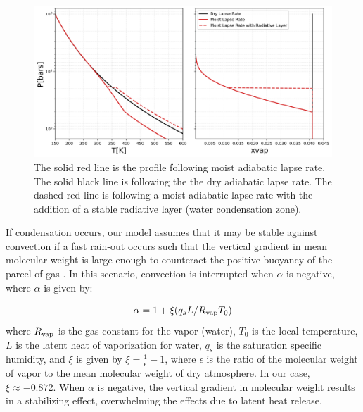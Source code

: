 \documentclass[11pt]{ucscthesisbs}
\begin{document}
\begin{figure}[ht!]
 \centerline{
  \includegraphics[width=6.5in]{figures/comparison_dry_vs_moist_lapse_rates.png}
 }
\caption[A Standard Interior Structure Model]
{The solid red line is the profile following moist adiabatic lapse rate. The solid black line is following the the dry adiabatic lapse rate. The dashed red line is following a moist adiabatic lapse rate with the addition of a stable radiative layer (water condensation zone).} 
\label{fig:comparison_adiabatic_profiles}
\end{figure}


If condensation occurs, our model assumes that it may be stable against convection if a fast rain-out occurs such that the vertical gradient in mean molecular weight is large enough to counteract the positive buoyancy of the parcel of gas \citep{leconte_2017} \citep{friedson_2017}. In this scenario, convection is interrupted when $\alpha$ is negative, where $\alpha$ \citep{friedson_2017} is given by:

\begin{equation}
  \alpha = 1 + \xi (q_{s} L / R_{\rm vap} T_{0}) 
  \label{eq:alpha}
\end{equation}
where $R_{\rm vap}$ is the gas constant for the vapor (water), $T_{0}$ is the local temperature, $L$ is the latent heat of vaporization for water, $q_{s}$ is the saturation specific humidity, and $\xi$ is given by $\xi = \frac{1}{\epsilon} - 1$, where $\epsilon$ is the ratio of the molecular weight of vapor to the mean molecular weight of dry atmosphere. In our case, $\xi \approx -0.872$. When $\alpha$ is negative, the vertical gradient in molecular weight results in a stabilizing effect, overwhelming the effects due to latent heat release.
\end{document}
